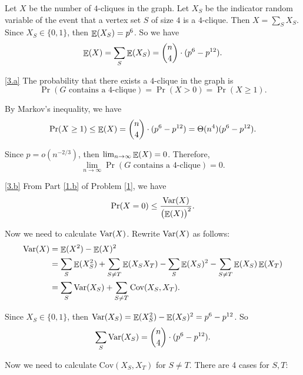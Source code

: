 \documentclass{homework}
\begin{document}
\begin{solution}

  Let $X$ be the number of $4$-cliques in the graph. Let $X_S$ be
  the indicator random variable of the event that
  a vertex set $S$ of size $4$ is a $4$-clique.
  Then $X = \sum_{S} X_S$. Since $X_S \in \{0, 1\}$, then $\mathop{\mathbb{E}}\displaylimits(X_S) = p^6$.
  So we have
  \begin{equation*}
    \mathop{\mathbb{E}}\displaylimits(X) = \sum_{S} \mathop{\mathbb{E}}\displaylimits(X_S) = \binom{n}{4} \cdot (p^6 - p^{12}).
  \end{equation*}

  \ref{3.a}
  The probability that there exists a $4$-clique in the graph is
  \begin{equation*}
    \Pr(G \text{ contains a $4$-clique}) = \Pr(X > 0) = \Pr(X \ge 1).
  \end{equation*}

  By Markov's inequality, we have
  \begin{equation*}
    \Pr(X \ge 1) \le \mathop{\mathbb{E}}\displaylimits(X) = \binom{n}{4} \cdot (p^6 - p^{12}) = \Theta(n^4)(p^6-p^{12}).
  \end{equation*}

  Since $p = o(n^{-2/3})$, then $\lim_{n \to \infty}\mathop{\mathbb{E}}\displaylimits(X) = 0$. Therefore,
  \begin{equation*}
    \lim_{n \to \infty} \Pr(G \text{ contains a $4$-clique}) = 0.
  \end{equation*}

  \ref{3.b}
  From Part \ref{1.b} of Problem \ref{1}, we have
  \begin{equation*}
    \Pr(X = 0) \le \frac{\mathop{\mathrm{Var}}\displaylimits(X)}{{\bigl(\mathop{\mathbb{E}}\displaylimits(X)\bigr)}^{2}}.
  \end{equation*}

  Now we need to calculate $\mathop{\mathrm{Var}}\displaylimits(X)$. Rewrite $\mathop{\mathrm{Var}}\displaylimits(X)$ as follows:
  \begin{align*}
    \mathop{\mathrm{Var}}\displaylimits(X) & = \mathop{\mathbb{E}}\displaylimits(X^2) - \mathop{\mathbb{E}}\displaylimits(X)^2 \\
    & = \sum_{S}\mathop{\mathbb{E}}\displaylimits(X_S^2) + \sum_{S \neq T}\mathop{\mathbb{E}}\displaylimits(X_SX_T) - \sum_S \mathop{\mathbb{E}}\displaylimits(X_S)^2 - \sum_{S \neq T}\mathop{\mathbb{E}}\displaylimits(X_S)\mathop{\mathbb{E}}\displaylimits(X_T) \\
    & = \sum_{S}\mathop{\mathrm{Var}}\displaylimits(X_S) + \sum_{S \neq T}\text{Cov}(X_S, X_T).
  \end{align*}

  Since $X_S \in \{0, 1\}$, then $\mathop{\mathrm{Var}}\displaylimits(X_S) = \mathop{\mathbb{E}}\displaylimits(X_S^2) - \mathop{\mathbb{E}}\displaylimits(X_S)^2 = p^6 - p^{12}$.
  So
  \begin{equation*}
    \sum_{S}\mathop{\mathrm{Var}}\displaylimits(X_S) = \binom{n}{4} \cdot (p^6 - p^{12}).
  \end{equation*}

  Now we need to calculate $\text{Cov}(X_S, X_T)$ for $S \neq T$.
  There are 4 cases for $S, T$:
  

\end{solution}
\end{document}
